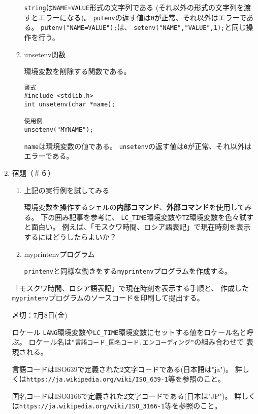 \documentclass[a4j,dvipdfmx]{jarticle}
\begin{document}
\begin{enumerate}
\begin{enumerate}
\verb/string/は\verb/NAME=VALUE/形式の文字列である
(それ以外の形式の文字列を渡すとエラーになる)。
\verb/putenv/の返す値は\verb/0/が正常、それ以外はエラーである。
\verb/putenv("NAME=VALUE");/は、
\verb/setenv("NAME","VALUE",1);/と同じ操作を行う。

\item unsetenv関数

環境変数を削除する関数である。

\begin{lstlisting}[numbers=none]
書式
#include <stdlib.h>
int unsetenv(char *name);

使用例
unsetenv("MYNAME");
\end{lstlisting}

\verb/name/は環境変数の値である。
\verb/unsetenv/の返す値は\verb/0/が正常、それ以外はエラーである。

\end{enumerate}

\item 宿題（＃６）

\begin{enumerate}
\item 上記の実行例を試してみる

環境変数を操作するシェルの{\bf 内部コマンド}、{\bf 外部コマンド}を使用してみる。
下の囲み記事を参考に、
\verb/LC_TIME/環境変数や\verb/TZ/環境変数を色々試すと面白い。
例えば、「モスクワ時間、ロシア語表記」で現在時刻を表示するにはどうしたらよいか？

\item myprintenvプログラム

\verb/printenv/と同様な働きをする\verb/myprintenv/プログラムを作成する。

\end{enumerate}

「モスクワ時間、ロシア語表記」で現在時刻を表示する手順と、
作成した\verb/myprintenv/プログラムのソースコードを印刷して提出する。

〆切：7月8日(金)

\begin{itembox}[l]{ロケール}
\verb/LANG/環境変数や\verb/LC_TIME/環境変数にセットする値をロケール名と呼ぶ。
ロケール名は\verb/"言語コード_国名コード.エンコーディング"/の組み合わせで
表現される。

言語コードはISO639で定義された2文字コードである(日本語は"ja")。
詳しくは\verb;https://ja.wikipedia.org/wiki/ISO_639-1;等を参照のこと。

国名コードはISO3166で定義された2文字コードである(日本は"JP")。
詳しくは\verb;https://ja.wikipedia.org/wiki/ISO_3166-1;等を参照のこと。


\end{itembox}
\end{enumerate}
\end{document}
